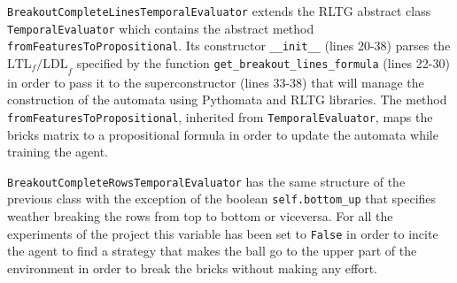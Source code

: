 \texttt{BreakoutCompleteLinesTemporalEvaluator} extends the RLTG abstract class
\texttt{TemporalEvaluator} which contains the abstract method
\texttt{fromFeaturesToPropositional}. Its constructor \texttt{__init__} (lines
20-38) parses the $\text{LTL}_f\text{/LDL}_f$ specified by the function
\texttt{get_breakout_lines_formula} (lines 22-30) in order to pass it to
the superconstructor (lines 33-38) that will manage the construction of the
automata using Pythomata and RLTG libraries. The method
\texttt{fromFeaturesToPropositional}, inherited from \texttt{TemporalEvaluator},
maps the bricks matrix to a propositional formula in order to update the
automata while training the agent.

\texttt{BreakoutCompleteRowsTemporalEvaluator} has the same structure of the
previous class with the exception of the boolean \texttt{self.bottom_up} that
specifies weather breaking the rows from top to bottom or viceversa.
For all the experiments of the project this variable has been set to
\texttt{False} in order to incite the agent to find a strategy that makes the
ball go to the upper part of the environment in order to break the bricks
without making any effort.

